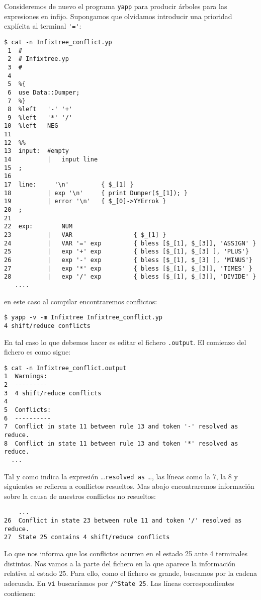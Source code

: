 \begin{example}
Consideremos de nuevo el programa \verb|yapp| para producir
árboles para las expresiones en infijo. Supongamos que olvidamos
introducir una prioridad explícita al terminal \verb|'='|:
\begin{verbatim}
$ cat -n Infixtree_conflict.yp
 1  #
 2  # Infixtree.yp
 3  #
 4
 5  %{
 6  use Data::Dumper;
 7  %}
 8  %left   '-' '+'
 9  %left   '*' '/'
10  %left   NEG
11
12  %%
13  input:  #empty
14          |   input line
15  ;
16
17  line:     '\n'         { $_[1] }
18          | exp '\n'     { print Dumper($_[1]); }
19          | error '\n'   { $_[0]->YYErrok }
20  ;
21
22  exp:        NUM
23          |   VAR                 { $_[1] }
24          |   VAR '=' exp         { bless [$_[1], $_[3]], 'ASSIGN' }
25          |   exp '+' exp         { bless [$_[1], $_[3] ], 'PLUS'}
26          |   exp '-' exp         { bless [$_[1], $_[3] ], 'MINUS'}
27          |   exp '*' exp         { bless [$_[1], $_[3]], 'TIMES' }
28          |   exp '/' exp         { bless [$_[1], $_[3]], 'DIVIDE' }
   ....
\end{verbatim}
en este caso al compilar encontraremos conflictos:
\begin{verbatim}
$ yapp -v -m Infixtree Infixtree_conflict.yp
4 shift/reduce conflicts
\end{verbatim}
En tal caso lo que debemos hacer es editar el fichero \verb|.output|.
El comienzo del fichero es como sigue:
\begin{verbatim}
$ cat -n Infixtree_conflict.output
1  Warnings:
2  ---------
3  4 shift/reduce conflicts
4
5  Conflicts:
6  ----------
7  Conflict in state 11 between rule 13 and token '-' resolved as reduce.
8  Conflict in state 11 between rule 13 and token '*' resolved as reduce.
  ...
\end{verbatim}
Tal y como indica la expresión \ldots \verb|resolved as| \ldots,
las líneas como la 7, la 8 y siguientes se refieren a conflictos resueltos.
Mas abajo encontraremos información sobre 
la causa de nuestros conflictos no resueltos:
\begin{verbatim}
    ...
26  Conflict in state 23 between rule 11 and token '/' resolved as reduce.
27  State 25 contains 4 shift/reduce conflicts
\end{verbatim}
Lo que nos informa que los conflictos 
ocurren en el estado 25 ante 4 terminales
distintos. Nos vamos a la parte del fichero 
en la que aparece la información relativa al estado 25. Para ello,
como el fichero es grande, buscamos por la cadena adecuada.
En \verb|vi| buscaríamos por \verb|/^State 25|. Las líneas
correspondientes contienen:


\end{example}

